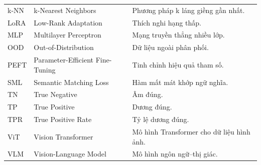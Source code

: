 \begin{longtable}{@{}p{}p{}p{}@{}}
k-NN & k-Nearest Neighbors & Phương pháp k láng giềng gần nhất. \\
LoRA & Low-Rank Adaptation & Thích nghi hạng thấp. \\
MLP & Multilayer Perceptron & Mạng truyền thẳng nhiều lớp. \\
OOD & Out-of-Distribution & Dữ liệu ngoài phân phối. \\
PEFT & Parameter-Efficient Fine-Tuning & Tinh chỉnh hiệu quả tham số. \\
SML & Semantic Matching Loss & Hàm mất mát khớp ngữ nghĩa. \\
TN & True Negative & Âm đúng. \\
TP & True Positive & Dương đúng. \\
TPR & True Positive Rate & Tỷ lệ dương đúng. \\
ViT & Vision Transformer & Mô hình Transformer cho dữ liệu hình ảnh. \\
VLM & Vision-Language Model & Mô hình ngôn ngữ--thị giác. \\
\end{longtable}
\endgroup
